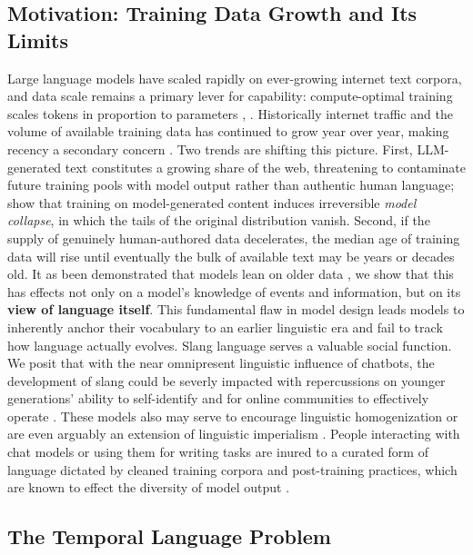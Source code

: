 \documentclass[11pt]{article}
\begin{document}
\subsection{Motivation: Training Data Growth and Its Limits}
Large language models have scaled rapidly on ever-growing internet text corpora, and data scale remains a primary lever for capability: compute-optimal training scales tokens in proportion to parameters \citep{hoffmann2022chinchilla}, \citep{zhao2023survey}. Historically internet traffic and the volume of available training data has continued to grow year over year, making recency a secondary concern \citep{villalobos2024datalimits, zhao2023survey, reinsel2018digitization}. Two trends are shifting this picture. First, LLM-generated text constitutes a growing share of the web, threatening to contaminate future training pools with model output rather than authentic human language; \citet{shumailov2023curse} show that training on model-generated content induces irreversible \textit{model collapse}, in which the tails of the original distribution vanish. Second, if the supply of genuinely human-authored data decelerates, the median age of training data will rise until eventually the bulk of available text may be years or decades old. It as been demonstrated that models lean on older data \citep{zhao2024temporal,zhang2023mitigatingtemporal, luu2022temporal, cheng2024dated}, we show that this has effects not only on a model's knowledge of events and information, but on its \textbf{view of language itself}. This fundamental flaw in model design leads models to inherently anchor their vocabulary to an earlier linguistic era and fail to track how language actually evolves.
Slang language serves a valuable social function. We posit that with the near omnipresent linguistic influence of chatbots, the development of slang could be severly impacted with repercussions on younger generations' ability to self-identify \citep{eble1989slang} and for online communities to effectively operate \citep{danescu-niculescu-mizil2013nocountry}. These models also may serve to encourage linguistic homogenization or are even arguably an extension of linguistic imperialism \citep{phillipson1992imperialism}. People interacting with chat models or using them for writing tasks are inured to a curated form of language dictated by cleaned training corpora and post-training practices, which are known to effect the diversity of model output \citep{xiao2024algorithmic, casper2023open}.

\subsection{The Temporal Language Problem}
\end{document}

